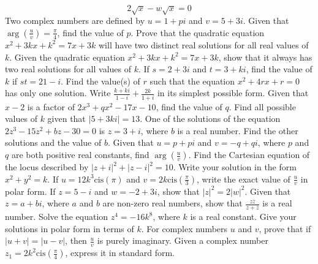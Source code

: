 \documentclass[12pt,addpoints]{exam}
\begin{document}
\begin{questions}
\[ 2\sqrt{x} - w\sqrt{x} = 0 \]
\fillwithlines{5cm}
\question[5] Two complex numbers are defined by \( u = 1 + pi \) and \( v = 5 + 3i \). Given that \( \arg \left( \frac{u}{v} \right) = \frac{\pi}{4} \), find the value of \( p \).
\fillwithlines{5cm}
\question[5] Prove that the quadratic equation \(x^2 + 3kx + k^2 = 7x + 3k\) will have two distinct real solutions for all real values of \(k\).
\fillwithlines{5cm}
\question[5] Given the quadratic equation \( x^2 + 3kx + k^2 = 7x + 3k \), show that it always has two real solutions for all values of \( k \).
\fillwithlines{5cm}
\question[5] If \( s = 2 + 3i \) and \( t = 3 + ki \), find the value of \( k \) if \( st = 21 - i \).
\fillwithlines{5cm}
\question[5] Find the value(s) of \( r \) such that the equation \( x^2 + 4rx + r = 0 \) has only one solution.
\fillwithlines{5cm}
\question[5] Write \(\frac{k + ki}{1 - i} + \frac{2k}{1 + i}\) in its simplest possible form.
\fillwithlines{5cm}
\question[5] Given that \(x - 2\) is a factor of \(2x^3 + qx^2 - 17x - 10\), find the value of \(q\).
\fillwithlines{5cm}
\question[5] Find all possible values of \( k \) given that \(|5 + 3ki| = 13\).
\fillwithlines{5cm}
\question[5] One of the solutions of the equation \(2z^3 - 15z^2 + bz - 30 = 0\) is \(z = 3 + i\), where \(b\) is a real number. Find the other solutions and the value of \(b\).
\fillwithlines{5cm}
\question[5] Given that \( u = p + pi \) and \( v = -q + qi \), where \( p \) and \( q \) are both positive real constants, find \( \arg \left( \frac{u}{v} \right) \).
\fillwithlines{5cm}
\question[5] Find the Cartesian equation of the locus described by \( |z + i|^2 + |z - i|^2 = 10 \). Write your solution in the form \( x^2 + y^2 = k \).
\fillwithlines{5cm}
\question[5] If \( u = 12k^3 \text{cis}(\pi) \) and \( v = 2k \text{cis} \left( \frac{\pi}{3} \right) \), write the exact value of \( \frac{u}{v} \) in polar form.
\fillwithlines{5cm}
\question[5] If \( z = 5 - i \) and \( w = -2 + 3i \), show that \( |z|^2 = 2|w|^2 \).
\fillwithlines{5cm}
\question[5] Given that \( z = a + bi \), where \( a \) and \( b \) are non-zero real numbers, show that \(\frac{z \overline{z}}{z + \overline{z}}\) is a real number.
\fillwithlines{5cm}
\question[5] Solve the equation \( z^4 = -16k^8 \), where \( k \) is a real constant. Give your solutions in polar form in terms of \( k \).
\fillwithlines{5cm}
\question[5] For complex numbers \( u \) and \( v \), prove that if \( |u + v| = |u - v| \), then \( \frac{u}{v} \) is purely imaginary.
\fillwithlines{5cm}
\question[5] Given a complex number \( z_1 = 2k^2 \text{cis} \left( \frac{\pi}{4} \right) \), express it in standard form.

\end{questions}
\end{document}
